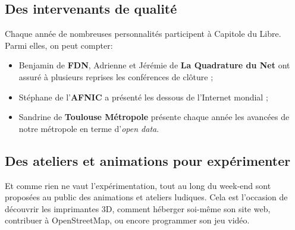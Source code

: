 \subsection{Des intervenants de qualité}

Chaque année de nombreuses personnalités participent à Capitole du Libre. Parmi elles, on peut compter:

\begin{itemize}[label=$\bullet$]
\item Benjamin  de \textbf{FDN}, Adrienne  et Jérémie  de \textbf{La Quadrature du Net} ont assuré à plusieurs reprises les conférences de clôture ;
\item Stéphane  de l'\textbf{AFNIC} a présenté les dessous de l'Internet mondial ;
\item Sandrine  de \textbf{Toulouse Métropole} présente chaque année les avancées de notre métropole en terme d'\textit{open data}.
\end{itemize} 

\subsection{Des ateliers et animations pour expérimenter}

\begin{minipage}{0.7\textwidth}
Et comme rien ne vaut l'expérimentation, tout au long du week-end sont 
proposées au public des animations et ateliers ludiques. Cela est 
l'occasion de découvrir les imprimantes 3D, comment héberger soi-même son 
site web, contribuer à OpenStreetMap, ou encore programmer son jeu vidéo.
\end{minipage}
\begin{minipage}{0.3\textwidth}
\end{minipage}

